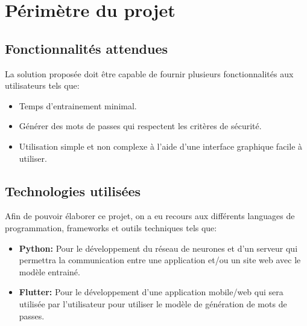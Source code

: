 \section{Périmètre du projet}
\subsection{Fonctionnalités attendues}
La solution proposée doit être capable de fournir plusieurs fonctionnalités aux utilisateurs tels que:
\begin{itemize}
    \item Temps d'entrainement minimal.
    \item Générer des mots de passes qui respectent les critères de sécurité.
    \item Utilisation simple et non complexe à l'aide d'une interface graphique facile à utiliser.
\end{itemize}
\subsection{Technologies utilisées}
Afin de pouvoir élaborer ce projet, on a eu recours aux différents languages de programmation, frameworks et outils techniques tels que:
\begin{itemize}
    \item \textbf{Python:} Pour le développement du réseau de neurones et d'un serveur qui permettra la communication entre une application et/ou un site web avec le modèle entrainé.
    \item \textbf{Flutter:} Pour le développement d'une application mobile/web qui sera utilisée par l'utilisateur pour utiliser le modèle de génération de mots de passes.
\end{itemize}